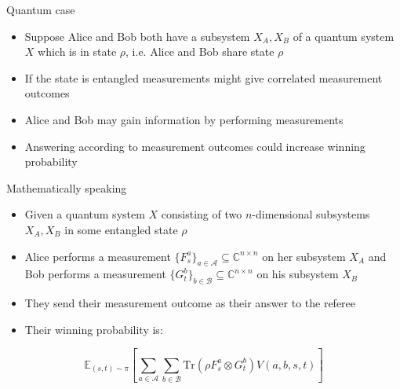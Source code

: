 \begin{frame}{Quantum case}
\begin{itemize}
    \item Suppose Alice and Bob both have a subsystem $X_A, X_B$ of a quantum system $X$ which is in state $\rho$, i.e. Alice and Bob share state $\rho$ \pause
    \item If the state is entangled measurements might give correlated measurement outcomes \pause
    \item Alice and Bob may gain information by performing measurements \pause
    \item Answering according to measurement outcomes could increase winning probability 
\end{itemize}
\end{frame}


\begin{frame}{Mathematically speaking}
\begin{itemize}
    \item Given a quantum system $X$ consisting of two $n$-dimensional subsystems $X_A, X_B$ in some entangled state $\rho$ \pause
    \item Alice performs a measurement $\{ F_s^a \}_{a\in \mathcal{A}}\subseteq \mathbb{C}^{n \times n}$ on her subsystem $X_A$ and Bob performs a measurement $\{ G_t^b\}_{b \in \mathcal{B}} \subseteq \mathbb{C}^{n \times n}$ on his subsystem $X_B$ \pause
    \item They send their measurement outcome as their answer to the referee \pause
    \item Their winning probability is:
\end{itemize}
\begin{equation*}
\mathbb{E}_{(s,t) \sim \pi} \left[ \sum_{a \in \mathcal{A}} \sum_{b \in \mathcal{B}} \text{Tr}(\rho F_s^a \otimes G_t^b) V(a,b,s,t) \right]
\end{equation*}  
\end{frame}

